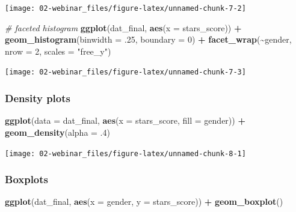 \documentclass[
  oneside]{book}
\newenvironment{Shaded}{\begin{snugshade}}{\end{snugshade}}
\newcommand{\AttributeTok}[1]{\textcolor[rgb]{0.13,0.29,0.53}{#1}}
\newcommand{\CommentTok}[1]{\textcolor[rgb]{0.56,0.35,0.01}{\textit{#1}}}
\newcommand{\DecValTok}[1]{\textcolor[rgb]{0.00,0.00,0.81}{#1}}
\newcommand{\FunctionTok}[1]{\textcolor[rgb]{0.13,0.29,0.53}{\textbf{#1}}}
\newcommand{\NormalTok}[1]{#1}
\newcommand{\SpecialCharTok}[1]{\textcolor[rgb]{0.81,0.36,0.00}{\textbf{#1}}}
\newcommand{\StringTok}[1]{\textcolor[rgb]{0.31,0.60,0.02}{#1}}
\begin{document}
\begin{center}\texttt{[image: 02-webinar\_files/figure-latex/unnamed-chunk-7-2]} \end{center}

\begin{Shaded}
\begin{Highlighting}[]
\CommentTok{\# faceted histogram}
\FunctionTok{ggplot}\NormalTok{(dat\_final, }\FunctionTok{aes}\NormalTok{(}\AttributeTok{x =}\NormalTok{ stars\_score)) }\SpecialCharTok{+}
  \FunctionTok{geom\_histogram}\NormalTok{(}\AttributeTok{binwidth =}\NormalTok{ .}\DecValTok{25}\NormalTok{, }
                 \AttributeTok{boundary =} \DecValTok{0}\NormalTok{) }\SpecialCharTok{+}
  \FunctionTok{facet\_wrap}\NormalTok{(}\SpecialCharTok{\textasciitilde{}}\NormalTok{gender, }\AttributeTok{nrow =} \DecValTok{2}\NormalTok{, }\AttributeTok{scales =} \StringTok{"free\_y"}\NormalTok{)}
\end{Highlighting}
\end{Shaded}

\begin{center}\texttt{[image: 02-webinar\_files/figure-latex/unnamed-chunk-7-3]} \end{center}

\subsubsection{Density plots}\label{density-plots}

\begin{Shaded}
\begin{Highlighting}[]
\FunctionTok{ggplot}\NormalTok{(}\AttributeTok{data =}\NormalTok{ dat\_final, }\FunctionTok{aes}\NormalTok{(}\AttributeTok{x =}\NormalTok{ stars\_score, }\AttributeTok{fill =}\NormalTok{ gender)) }\SpecialCharTok{+}
  \FunctionTok{geom\_density}\NormalTok{(}\AttributeTok{alpha =}\NormalTok{ .}\DecValTok{4}\NormalTok{)}
\end{Highlighting}
\end{Shaded}

\begin{center}\texttt{[image: 02-webinar\_files/figure-latex/unnamed-chunk-8-1]} \end{center}

\subsubsection{Boxplots}\label{boxplots}

\begin{Shaded}
\begin{Highlighting}[]
\FunctionTok{ggplot}\NormalTok{(dat\_final, }\FunctionTok{aes}\NormalTok{(}\AttributeTok{x =}\NormalTok{ gender, }\AttributeTok{y =}\NormalTok{ stars\_score)) }\SpecialCharTok{+}
  \FunctionTok{geom\_boxplot}\NormalTok{()}
\end{Highlighting}
\end{Shaded}
\end{document}
